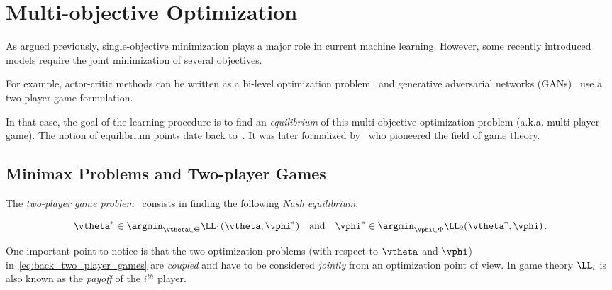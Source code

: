 \section{Multi-objective Optimization}

\label{sec:multi_objective}

As argued previously, single-objective minimization plays a major role in current machine learning. However, some recently introduced models require the joint minimization of several objectives.

For example, actor-critic methods can be written as a bi-level optimization problem~\citep{pfau2016connecting} and generative adversarial networks (GANs)~\citep{goodfellow2014generative} use a two-player game formulation. 




In that case, the goal of the learning procedure is to find an \emph{equilibrium} of this multi-objective optimization problem (a.k.a. multi-player game). The notion of equilibrium points date back to~\citet{cournot1838recherches}. It was later formalized by~\citet{nash1950equilibrium} who pioneered the field of game theory. 




\subsection{Minimax Problems and Two-player Games}







The \emph{two-player game problem}~\citep{von1944theory,nash1950equilibrium} consists in finding the following \emph{Nash equilibrium}:



\begin{equation} \label{eq:back_two_player_games}
\vtheta^* \in \argmin_{\vtheta \in \Theta}\LL_1(\vtheta,\vphi^*)
\quad \text{and} \quad
\vphi^* \in \argmin_{\vphi \in \Phi} \LL_2(\vtheta^*,\vphi) \,.
\end{equation}

One important point to notice is that the two optimization problems (with respect to $\vtheta$ and $\vphi$) in~\eqref{eq:back_two_player_games} are \emph{coupled} and have to be considered \emph{jointly} from an optimization point of view. In game theory $\LL_i$ is also known as the \emph{payoff} of the $i^{th}$ player.







